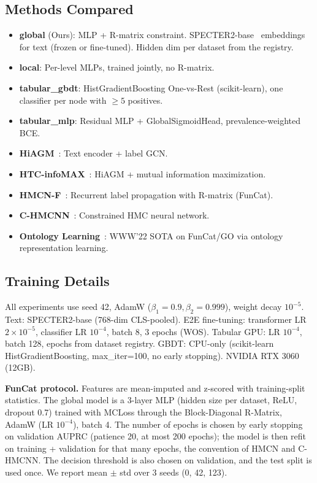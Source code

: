 \documentclass[11pt,a4paper]{article}
\begin{document}
\subsection{Methods Compared}

\begin{itemize}[leftmargin=*,nosep]
  \item \textbf{global} (Ours): MLP + R-matrix constraint.
    SPECTER2-base~\cite{specter} embeddings for text (frozen or
    fine-tuned). Hidden dim per dataset from the registry.
  \item \textbf{local}: Per-level MLPs, trained jointly, no R-matrix.
  \item \textbf{tabular\_gbdt}: HistGradientBoosting One-vs-Rest
    (scikit-learn), one classifier per node with $\geq 5$ positives.
  \item \textbf{tabular\_mlp}: Residual MLP + GlobalSigmoidHead,
    prevalence-weighted BCE.
  \item \textbf{HiAGM}~\cite{zhou2020hiagm}: Text encoder + label GCN.
  \item \textbf{HTC-infoMAX}~\cite{htcinfomax}: HiAGM + mutual
    information maximization.
  \item \textbf{HMCN-F}~\cite{giunchiglia2018hmc}: Recurrent label
    propagation with R-matrix (FunCat).
  \item \textbf{C-HMCNN}~\cite{chmcnn}: Constrained HMC neural network.
  \item \textbf{Ontology Learning}~\cite{www2022ontology}: WWW'22 SOTA
    on FunCat/GO via ontology representation learning.
\end{itemize}

\subsection{Training Details}

All experiments use seed 42, AdamW ($\beta_1=0.9, \beta_2=0.999$),
weight decay $10^{-5}$. Text: SPECTER2-base (768-dim CLS-pooled).
E2E fine-tuning: transformer LR $2\times10^{-5}$, classifier LR
$10^{-4}$, batch 8, 3 epochs (WOS). Tabular GPU: LR $10^{-4}$, batch
128, epochs from dataset registry. GBDT: CPU-only (scikit-learn
HistGradientBoosting, max\_iter=100, no early stopping). NVIDIA RTX
3060 (12GB).

\textbf{FunCat protocol.} Features are mean-imputed and z-scored with
training-split statistics. The global model is a 3-layer MLP (hidden
size per dataset, ReLU, dropout 0.7) trained with MCLoss through the
Block-Diagonal R-Matrix, AdamW (LR $10^{-4}$), batch 4. The number of
epochs is chosen by early stopping on validation AUPRC (patience 20,
at most 200 epochs); the model is then refit on training + validation
for that many epochs, the convention of HMCN and C-HMCNN. The
decision threshold is also chosen on validation, and the test split is
used once. We report mean $\pm$ std over 3 seeds (0, 42, 123).
\end{document}
